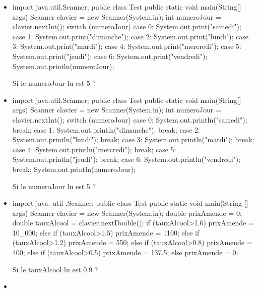 \documentclass[11pt,a4paper]{article}
\begin{document}
					\begin{itemize}
				
			\item \begin{Java}
import java.util.Scanner;
public class Test{
  public static void main(String[] args){
      Scanner clavier = new Scanner(System.in);
      int numeroJour = clavier.nextInt();
      switch (numeroJour) {
        case 0: System.out.print("samedi");
        case 1: System.out.print("dimanche");
        case 2: System.out.print("lundi");
        case 3: System.out.print("mardi");
        case 4: System.out.print("mercredi");
        case 5: System.out.print("jeudi");
        case 6: System.out.print("vendredi");
      }
      System.out.println(numeroJour);
    }
}
				\end{Java}Si le numeroJour lu est 5 ? 
            \par
         \textcolor{gray}{\underline{\hspace*{10em}}} 
			\item \begin{Java}
import java.util.Scanner;
public class Test{
  public static void main(String[] args){
      Scanner clavier = new Scanner(System.in);
      int numeroJour = clavier.nextInt();
      switch (numeroJour) {
        case 0: System.out.println("samedi"); break;
        case 1: System.out.println("dimanche"); break;
        case 2: System.out.println("lundi"); break;
        case 3: System.out.println("mardi"); break;
        case 4: System.out.println("mercredi"); break;
        case 5: System.out.println("jeudi"); break;
        case 6: System.out.println("vendredi"); break;
      }
      System.out.println(numeroJour);
    }
}
				\end{Java}Si le numeroJour lu est 5 ? 
            \par
         \textcolor{gray}{\underline{\hspace*{3em}}} 
			\item \begin{Java}

import java. util .Scanner;
public class Test {
    public static void main(String [] args) {
      Scanner clavier = new Scanner(System.in);
      double prixAmende = 0;
      double tauxAlcool = clavier.nextDouble();
      if (tauxAlcool>1.6) {
        prixAmende = 10_000;
      } else if (tauxAlcool>1.5){
        prixAmende = 1100;
      } else if (tauxAlcool>1.2){
        prixAmende = 550;
      } else if (tauxAlcool>0.8){
        prixAmende = 400;
      } else if (tauxAlcool>0.5){
        prixAmende = 137.5;
      } else {
        prixAmende = 0;
      }
    }
}
      \end{Java}Si le tauxAlcool lu est 0.9 ? 
            \par
         \textcolor{gray}{\underline{\hspace*{2em}}} 
			\item \begin{Java}


\end{Java}
\end{itemize}
\end{document}

